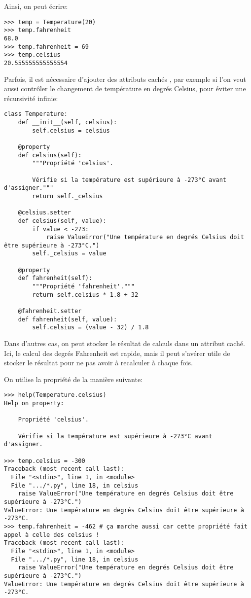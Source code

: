 Ainsi, on peut écrire:
\begin{verbatim}
>>> temp = Temperature(20)
>>> temp.fahrenheit
68.0
>>> temp.fahrenheit = 69
>>> temp.celsius
20.555555555555554
\end{verbatim}

Parfois, il est nécessaire d'ajouter des attributs \og cachés \fg{}, par exemple si l'on veut aussi contrôler le changement de 
température en degrés Celsius, pour éviter une récursivité infinie:

\begin{verbatim}
class Temperature:
    def __init__(self, celsius):
        self.celsius = celsius
    
    @property
    def celsius(self):
        """Propriété 'celsius'.
        
        Vérifie si la température est supérieure à -273°C avant d'assigner."""
        return self._celsius

    @celsius.setter
    def celsius(self, value):
        if value < -273:
            raise ValueError("Une température en degrés Celsius doit être supérieure à -273°C.")
        self._celsius = value
            
    @property
    def fahrenheit(self):
        """Propriété 'fahrenheit'."""
        return self.celsius * 1.8 + 32

    @fahrenheit.setter
    def fahrenheit(self, value):
        self.celsius = (value - 32) / 1.8
\end{verbatim}

Dans d'autres cas, on peut stocker le résultat de calculs dans un attribut caché. Ici, le calcul des degrés Fahrenheit est
rapide, mais il peut s'avérer utile de stocker le résultat pour ne pas avoir à recalculer à chaque fois.\medskip

On utilise la propriété de la manière suivante:
\begin{verbatim}
>>> help(Temperature.celsius)
Help on property:

    Propriété 'celsius'.
    
    Vérifie si la température est supérieure à -273°C avant d'assigner.
    
>>> temp.celsius = -300
Traceback (most recent call last):
  File "<stdin>", line 1, in <module>
  File ".../*.py", line 18, in celsius
    raise ValueError("Une température en degrés Celsius doit être supérieure à -273°C.")
ValueError: Une température en degrés Celsius doit être supérieure à -273°C.
>>> temp.fahrenheit = -462 # ça marche aussi car cette propriété fait appel à celle des celsius !
Traceback (most recent call last):
  File "<stdin>", line 1, in <module>
  File ".../*.py", line 18, in celsius
    raise ValueError("Une température en degrés Celsius doit être supérieure à -273°C.")
ValueError: Une température en degrés Celsius doit être supérieure à -273°C.
\end{verbatim}


